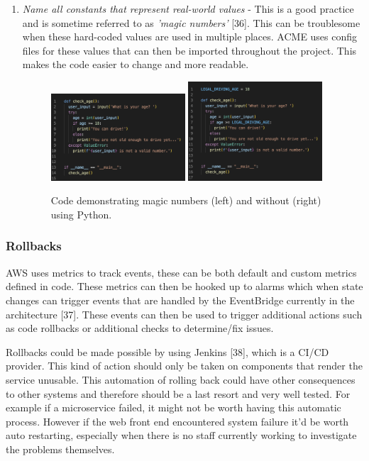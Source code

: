 \begin{enumerate}
    \item \textit{Name all constants that represent real-world values} - This is a good practice and is sometime referred to as \textit{'magic numbers'} [36].
    This can be troublesome when these hard-coded values are used in multiple places. ACME uses config files for these values that can then be imported 
    throughout the project. This makes the code easier to change and more readable.

    \begin{figure}[H]
      \centering
      \includegraphics[width=5cm]{assets/magicNumbers.png}
      \includegraphics[width=5cm]{assets/noMagicNumbers.png}
      \caption{Code demonstrating magic numbers (left) and without (right) using Python.}
      \label{fig:magicNumbers}
    \end{figure}

  \end{enumerate}


  \subsubsection{Rollbacks}
  \label{sec:Rollbacks}
  AWS uses metrics to track events, these can be both default and custom metrics defined in code. These metrics can then be hooked up to alarms which 
  when state changes can trigger events that are handled by the EventBridge currently in the architecture [37]. These events can then be used to trigger
  additional actions such as code rollbacks or additional checks to determine/fix issues.

  Rollbacks could be made possible by using Jenkins [38], which is a CI/CD provider. This kind of action should only be taken on components that render the
  service unusable. This automation of rolling back could have other consequences to other systems and therefore should be a last resort and very well 
  tested. For example if a microservice failed, it might not be worth having this automatic process. However if the web front end encountered system failure 
  it'd be worth auto restarting, especially when there is no staff currently working to investigate the problems themselves.
  
